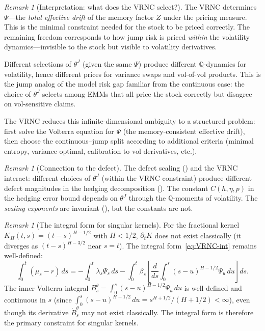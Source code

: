 \documentclass[11pt,a4paper]{article}
\theoremstyle{plain}
\theoremstyle{definition}
\theoremstyle{remark}
\newtheorem{remark}[theorem]{Remark}
\newcommand{\QQ}{\mathbb{Q}}
\begin{document}
\begin{remark}[Interpretation: what does the VRNC select?]
\label{rem:VRNC-selects}
The VRNC determines $\Psi$---the \emph{total effective drift} of
the memory factor $Z$ under the pricing measure.  This is the
minimal constraint needed for the stock to be priced correctly.
The remaining freedom corresponds to how jump risk is priced
\emph{within} the volatility dynamics---invisible to the stock
but visible to volatility derivatives.

Different selections of $\theta^J$ (given the same $\Psi$) produce
different $\QQ$-dynamics for volatility, hence different prices for
variance swaps and vol-of-vol products.  This is the jump analog of
the model risk gap familiar from the continuous case:
the choice of $\theta^J$ selects among
EMMs that all price the stock correctly but disagree on
vol-sensitive claims.

The VRNC reduces this infinite-dimensional ambiguity to a
structured problem: first solve the Volterra equation for $\Psi$
(the memory-consistent effective drift), then choose the
continuous--jump split according to additional criteria
(minimal entropy, variance-optimal, calibration to vol
derivatives, etc.).
\end{remark}

\begin{remark}[Connection to the defect]
\label{rem:VRNC-defect}
The defect scaling () and
the VRNC interact: different choices of $\theta^J$ (within the
VRNC constraint) produce different defect magnitudes in the
hedging decomposition ().  The constant
$C(h,\eta,p)$ in the hedging error bound depends on
$\theta^J$ through the $\QQ$-moments of volatility.  The
\emph{scaling exponents} are invariant
(), but the constants are not.
\end{remark}


\begin{remark}[The integral form for singular kernels]
\label{rem:VRNC-singular}
For the fractional kernel $K_H(t,s) = (t-s)^{H-1/2}$ with
$H < 1/2$, $\partial_t K$ does not exist classically (it diverges
as $(t-s)^{H-3/2}$ near $s = t$).  The integral
form~\eqref{eq:VRNC-int} remains well-defined:
\[
  \int_0^t(\mu_s - r)\,ds = -\int_0^t\lambda_s\Psi_s\,ds
  - \int_0^t\beta_s\!\left[\frac{d}{ds}\int_0^s
  (s-u)^{H-1/2}\Psi_u\,du\right]ds.
\]
The inner Volterra integral $B_s^\theta = \int_0^s(s-u)^{H-1/2}
\Psi_u\,du$ is well-defined and continuous in $s$ (since
$\int_0^s(s-u)^{H-1/2}\,du = s^{H+1/2}/(H+1/2) < \infty$),
even though its derivative $\dot{B}_s^\theta$ may not exist
classically.  The integral form is therefore the primary
constraint for singular kernels.
\end{remark}
\end{document}

